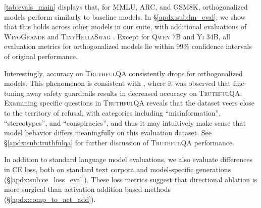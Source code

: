 \documentclass{article}
\begin{document}
\autoref{tab:evals_main} displays that, for \textsc{MMLU}, \textsc{ARC}, and \textsc{GSM8K}, orthogonalized models perform similarly to baseline models.
In \S\ref{apdx:sub:lm_eval}, we show that this holds across other models in our suite, with additional evaluations of \textsc{WinoGrande} \citep{sakaguchi2021winogrande} and \textsc{TinyHellaSwag} \citep{polo2024tinybenchmarks}.
Except for \textsc{Qwen 7B} and \textsc{Yi 34B}, all evaluation metrics for orthogonalized models lie within 99\% confidence intervals of original performance.

Interestingly, accuracy on \textsc{TruthfulQA} consistently drops for orthogonalized models.
This phenomenon is consistent with \citet{yang2023shadow}, where it was observed that fine-tuning away safety guardrails results in decreased accuracy on \textsc{TruthfulQA}.
Examining specific questions in \textsc{TruthfulQA} reveals that the dataset veers close to the territory of refusal, with categories including ``misinformation'', ``stereotypes'', and ``conspiracies'', and thus it may intuitively make sense that model behavior differs meaningfully on this evaluation dataset.
See \S\ref{apdx:sub:truthfulqa} for further discussion of \textsc{TruthfulQA} performance.

In addition to standard language model evaluations, we also evaluate differences in CE loss, both on standard text corpora and model-specific generations (\S\ref{apdx:sub:ce_loss_eval}).
These loss metrics suggest that directional ablation is more surgical than activation addition based methods (\S\ref{apdx:comp_to_act_add}).
\end{document}
